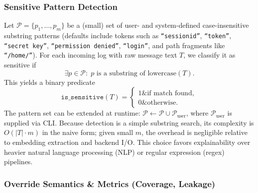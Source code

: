\subsubsection{Sensitive Pattern Detection}\label{s:compliance-pattern-detection}

Let $\mathcal{P} = \{p_1, \dots, p_m\}$ be a (small) set of user- and system-defined case-insensitive substring patterns (defaults include tokens such as \texttt{``sessionid''}, \texttt{``token''}, \texttt{``secret key''}, \texttt{``permission denied''}, \texttt{``login''}, and path fragments like \texttt{``/home/''}). For each incoming log with raw message text $T$, we classify it as sensitive if
\[
\exists p \in \mathcal{P}:\; p \text{ is a substring of } \text{lowercase}(T).
\]
This yields a binary predicate
\[
\texttt{is\_sensitive}(T) =
\begin{cases}
1\& \text{if match found},\\
0\& \text{otherwise}.
\end{cases}
\]
The pattern set can be extended at runtime: $\mathcal{P} \leftarrow \mathcal{P} \cup \mathcal{P}_{\text{user}}$, where $\mathcal{P}_{\text{user}}$ is supplied via CLI. Because detection is a simple substring search, its complexity is $O(|T| \cdot m)$ in the naive form; given small $m$, the overhead is negligible relative to embedding extraction and backend I/O. This choice favors explainability over heavier natural language processing (NLP) or regular expression (regex) pipelines.

\subsubsection{Override Semantics \& Metrics (Coverage, Leakage)}\label{s:compliance-metrics}

